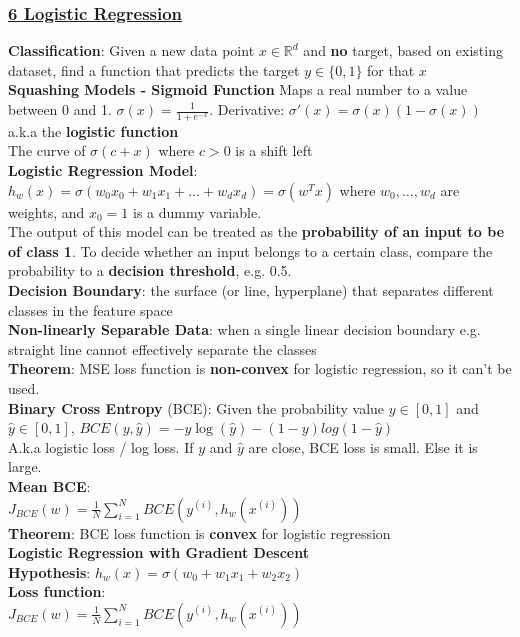 \documentclass{article}
\begin{document}
\begin{multicols*}{3}
\subsubsection*{\underline{6 Logistic Regression}}
\textbf{Classification}: Given a new data point $x\in \mathbb{R}^d$ and \textbf{no} target, based on existing dataset, find a function that predicts the target $y\in\{0, 1\}$ for that $x$ \\
\textbf{Squashing Models - Sigmoid Function} Maps a real number to a value between 0 and 1. $\sigma(x)=\frac{1}{1+e^{-x}}$. Derivative: $\sigma'(x)=\sigma(x)(1-\sigma(x))$ a.k.a the \textbf{logistic function} \\
The curve of $\sigma(c+x)$ where $c>0$ is a shift left\\
\textbf{Logistic Regression Model}: $h_w(x)=\sigma(w_0x_0+w_1x_1+\dots+w_dx_d)=\sigma(w^Tx)$ where $w_0,\dots,w_d$ are weights, and $x_0=1$ is a dummy variable. \\
The output of this model can be treated as the \textbf{probability of an input to be of class 1}. To decide whether an input belongs to a certain class, compare the probability to a \textbf{decision threshold}, e.g. 0.5. \\
\textbf{Decision Boundary}: the surface (or line, hyperplane) that separates different classes in the feature space \\
\textbf{Non-linearly Separable Data}: when a single linear decision boundary e.g. straight line cannot effectively separate the classes \\
\textbf{Theorem}: MSE loss function is \textbf{non-convex} for logistic regression, so it can't be used. \\
\textbf{Binary Cross Entropy} (BCE): Given the probability value $y\in[0,1]$ and $\hat{y}\in[0,1]$, $BCE(y,\hat{y})=-y\log(\hat{y})-(1-y)log(1-\hat{y})$ \\
A.k.a logistic loss / log loss. If $y$ and $\hat{y}$ are close, BCE loss is small. Else it is large. \\
\textbf{Mean BCE}: \\$J_{BCE}(w)=\frac{1}{N}\sum_{i=1}^N BCE(y^{(i)}, h_w(x^{(i)}))$\\ 
\textbf{Theorem}: BCE loss function is \textbf{convex} for logistic regression \\
\textbf{Logistic Regression with Gradient Descent} \\
\textbf{Hypothesis}: $h_w(x)=\sigma(w_0+w_1x_1+w_2x_2)$\\
\textbf{Loss function}: \\$J_{BCE}(w)=\frac{1}{N}\sum^N_{i=1}BCE(y^{(i)}, h_w(x^{(i)}))$\\

\end{multicols*}
\end{document}
